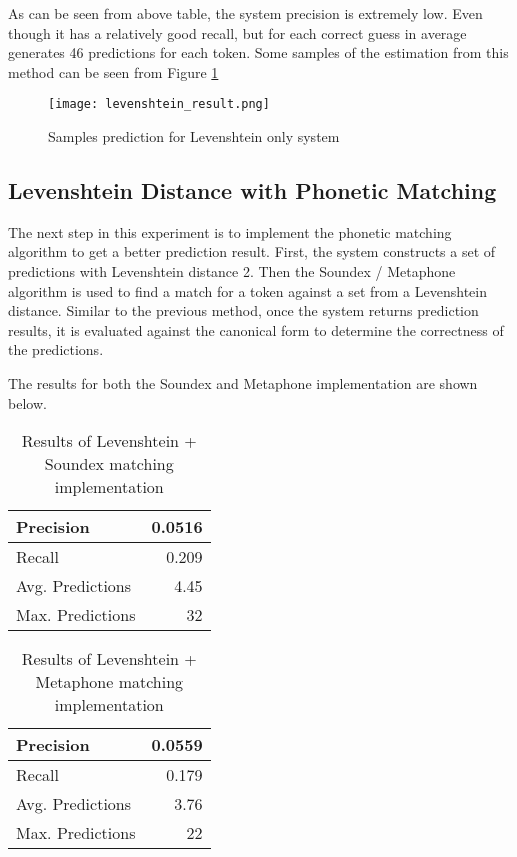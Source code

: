 \documentclass[11pt]{article}
\begin{document}
As can be seen from above table, the system precision is extremely low. Even though it has a relatively good recall, but for each correct guess in average generates 46 predictions for each token. Some samples of the estimation from this method can be seen from Figure \ref{fig:1}
\begin{figure}
    \centering
    \texttt{[image: levenshtein\_result.png]}
    \caption{Samples prediction for Levenshtein only system}
    \label{fig:1}
\end{figure}

\subsection{Levenshtein Distance with Phonetic Matching}
The next step in this experiment is to implement the phonetic matching algorithm to get a better prediction result. First, the system constructs a set of predictions with Levenshtein distance 2. Then the Soundex / Metaphone algorithm is used to find a match for a token against a set from a Levenshtein distance. Similar to the previous method, once the system returns prediction results, it is evaluated against the canonical form to determine the correctness of the predictions.

The results for both the Soundex and Metaphone implementation are shown below.
\begin{table}[h]
    \centering
    \begin{tabular}{|l||r|}
    \hline
        Precision & 0.0516 \\
    \hline
        Recall & 0.209 \\
    \hline
        Avg. Predictions & 4.45 \\
    \hline
        Max. Predictions & 32 \\
    \hline
    \end{tabular}
    \caption{Results of Levenshtein + Soundex matching implementation}
    \label{table:2}
\end{table}

\begin{table}[h]
    \centering
    \begin{tabular}{|l||r|}
    \hline
        Precision & 0.0559 \\
    \hline
        Recall & 0.179 \\
    \hline
        Avg. Predictions & 3.76 \\
    \hline
        Max. Predictions & 22 \\
    \hline
    \end{tabular}
    \caption{Results of Levenshtein + Metaphone matching implementation}
    \label{table:1}
\end{table}
\end{document}
